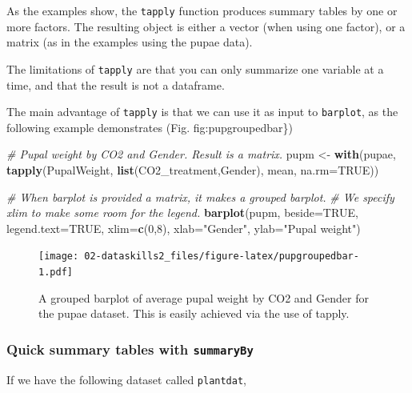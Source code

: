 \documentclass[]{book}
\newenvironment{Shaded}{\begin{snugshade}}{\end{snugshade}}
\newcommand{\CommentTok}[1]{\textcolor[rgb]{0.56,0.35,0.01}{\textit{#1}}}
\newcommand{\DataTypeTok}[1]{\textcolor[rgb]{0.13,0.29,0.53}{#1}}
\newcommand{\DecValTok}[1]{\textcolor[rgb]{0.00,0.00,0.81}{#1}}
\newcommand{\KeywordTok}[1]{\textcolor[rgb]{0.13,0.29,0.53}{\textbf{#1}}}
\newcommand{\NormalTok}[1]{#1}
\newcommand{\OtherTok}[1]{\textcolor[rgb]{0.56,0.35,0.01}{#1}}
\newcommand{\StringTok}[1]{\textcolor[rgb]{0.31,0.60,0.02}{#1}}
\begin{document}
As the examples show, the \texttt{tapply} function produces summary tables by one or more factors. The resulting object is either a vector (when using one factor), or a matrix (as in the examples using the pupae data).

The limitations of \texttt{tapply} are that you can only summarize one variable at a time, and that the result is not a dataframe.

The main advantage of \texttt{tapply} is that we can use it as input to \texttt{barplot}, as the following example demonstrates (Fig. fig:pupgroupedbar\})

\begin{Shaded}
\begin{Highlighting}[]
\CommentTok{# Pupal weight by CO2 and Gender. Result is a matrix.}
\NormalTok{pupm <-}\StringTok{ }\KeywordTok{with}\NormalTok{(pupae, }\KeywordTok{tapply}\NormalTok{(PupalWeight, }\KeywordTok{list}\NormalTok{(CO2_treatment,Gender), }
\NormalTok{                           mean, }\DataTypeTok{na.rm=}\OtherTok{TRUE}\NormalTok{))}

\CommentTok{# When barplot is provided a matrix, it makes a grouped barplot.}
\CommentTok{# We specify xlim to make some room for the legend.}
\KeywordTok{barplot}\NormalTok{(pupm, }\DataTypeTok{beside=}\OtherTok{TRUE}\NormalTok{, }\DataTypeTok{legend.text=}\OtherTok{TRUE}\NormalTok{, }\DataTypeTok{xlim=}\KeywordTok{c}\NormalTok{(}\DecValTok{0}\NormalTok{,}\DecValTok{8}\NormalTok{),}
        \DataTypeTok{xlab=}\StringTok{"Gender"}\NormalTok{, }\DataTypeTok{ylab=}\StringTok{"Pupal weight"}\NormalTok{)}
\end{Highlighting}
\end{Shaded}

\begin{figure}
\centering
\texttt{[image: 02-dataskills2\_files/figure-latex/pupgroupedbar-1.pdf]}
\caption{\label{fig:pupgroupedbar}A grouped barplot of average pupal weight by CO2 and Gender for the pupae dataset. This is easily achieved via the use of tapply.}
\end{figure}

\hypertarget{summaryby}{%
\subsubsection{\texorpdfstring{Quick summary tables with \texttt{summaryBy}}{Quick summary tables with summaryBy}}\label{summaryby}}

If we have the following dataset called \texttt{plantdat},
\end{document}
